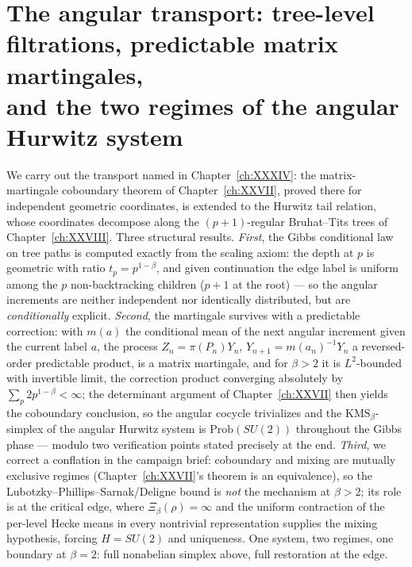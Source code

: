 \chapter[The angular transport]{The angular transport: tree-level filtrations, predictable matrix martingales,\\ and the two regimes of the angular Hurwitz system}\label{ch:XXXVI}
\renewcommand{\Prob}{\mathrm{Prob}}
\renewcommand{\F}{\mathcal{F}}
\begin{summary}
We carry out the transport named in Chapter~\ref{ch:XXXIV}: the matrix-martingale coboundary theorem
of Chapter~\ref{ch:XXVII}, proved there for independent geometric coordinates, is extended to the
Hurwitz tail relation, whose coordinates decompose along the $(p{+}1)$-regular
Bruhat--Tits trees of Chapter~\ref{ch:XXVIII}. Three structural results. \emph{First}, the Gibbs
conditional law on tree paths is computed exactly from the scaling axiom: the depth at
$p$ is geometric with ratio $t_p=p^{1-\beta}$, and given continuation the edge label is
uniform among the $p$ non-backtracking children ($p{+}1$ at the root) --- so the angular
increments are neither independent nor identically distributed, but are
\emph{conditionally} explicit. \emph{Second}, the martingale survives with a predictable
correction: with $m(a)$ the conditional mean of the next angular increment given the
current label $a$, the process $Z_n=\pi(P_n)Y_n$, $Y_{n+1}=m(a_n)^{-1}Y_n$ a
reversed-order predictable product, is a matrix martingale, and for $\beta>2$ it is
$L^2$-bounded with invertible limit, the correction product converging absolutely by
$\sum_p2p^{1-\beta}<\infty$; the determinant argument of Chapter~\ref{ch:XXVII} then yields the
coboundary conclusion, so the angular cocycle trivializes and the
$\mathrm{KMS}_\beta$-simplex of the angular Hurwitz system is $\Prob(SU(2))$ throughout
the Gibbs phase --- modulo two verification points stated precisely at the end.
\emph{Third}, we correct a conflation in the campaign brief: coboundary and mixing are
mutually exclusive regimes (Chapter~\ref{ch:XXVII}'s theorem is an equivalence), so the
Lubotzky--Phillips--Sarnak/Deligne bound is \emph{not} the mechanism at $\beta>2$; its
role is at the critical edge, where $\Xi_\beta(\rho)=\infty$ and the uniform contraction
of the per-level Hecke means in every nontrivial representation supplies the mixing
hypothesis, forcing $H=SU(2)$ and uniqueness. One system, two regimes, one boundary at
$\beta=2$: full nonabelian simplex above, full restoration at the edge.
\end{summary}


